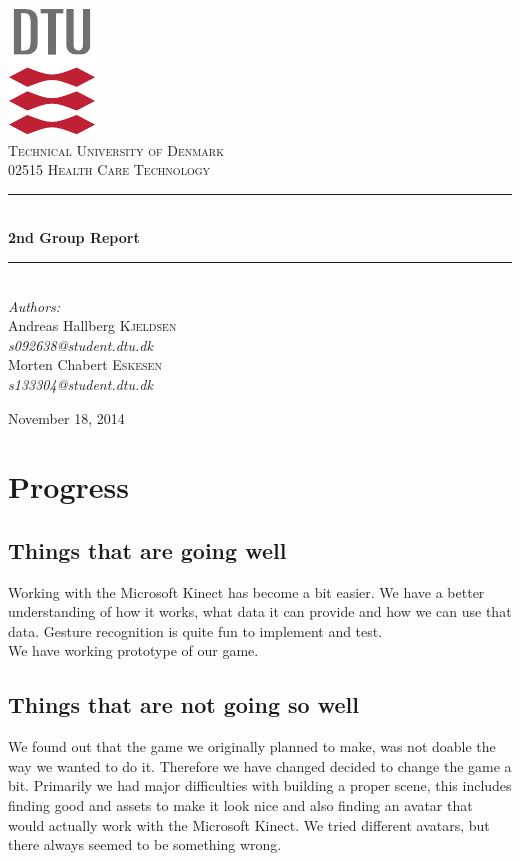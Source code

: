 \documentclass[12pt]{report}
\newcommand{\HRule}{\rule{\linewidth}{0.5mm}}
\begin{document}
\begin{titlepage}
\begin{center}

\includegraphics[scale=2.0]{../GFX/dtu_logo.pdf}\\[1cm]

\textsc{\LARGE Technical University of Denmark}\\[1.5cm]

\textsc{\Large 02515 Health Care Technology}\\[0.5cm]


\HRule \\[0.4cm]
{\huge \bfseries 2nd Group Report}\\[0.1cm]
\HRule \\[1.5cm]

\large
\emph{Authors:}
\\[10pt]
Andreas Hallberg \textsc{Kjeldsen}\\
\emph{s092638@student.dtu.dk}
\\[10pt]
Morten Chabert \textsc{Eskesen}\\
\emph{s133304@student.dtu.dk}

\vfill

{\large November 18, 2014}

\end{center}
\end{titlepage}

\section*{Progress}
\subsection*{Things that are going well}
Working with the Microsoft Kinect has become a bit easier. We have a better understanding of how it works, what data it can provide and how we can use that data. Gesture recognition is quite fun to implement and test.\\
We have working prototype of our game.

\subsection*{Things that are not going so well}
We found out that the game we originally planned to make, was not doable the way we wanted to do it. Therefore we have changed decided to change the game a bit. Primarily we had major difficulties with building a proper scene, this includes finding good and assets to make it look nice and also finding an avatar that would actually work with the Microsoft Kinect. We tried different avatars, but there always seemed to be something wrong.
\end{document}
